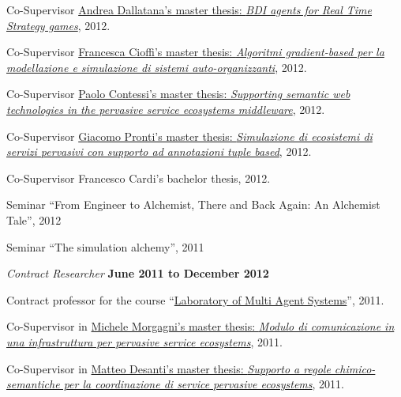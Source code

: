\documentclass[10pt]{article}
\newenvironment{outerlist}[1][\enskip\textbullet]%
        {\begin{itemize}[#1]}{\end{itemize}%
         \vspace{-.6\baselineskip}}
\newenvironment{innerlist}[1][\enskip\textbullet]%
        {\begin{compactitem}[#1]}{\end{compactitem}}
\newcommand{\halfblankline}{\quad\vspace{-0.5\baselineskip}\pagebreak[3]}
\begin{document}
\begin{outerlist}
\begin{innerlist}
      \item Co-Supervisor \href{http://amslaurea.unibo.it/4217/}{Andrea Dallatana's master thesis: \textit{BDI agents for Real Time Strategy games}}, 2012.
      \item Co-Supervisor \href{http://amslaurea.unibo.it/4088/}{Francesca Cioffi's master thesis: \textit{Algoritmi gradient-based per la modellazione e simulazione di sistemi auto-organizzanti}}, 2012.
      \item Co-Supervisor \href{http://amslaurea.unibo.it/4074/}{Paolo Contessi's master thesis: \textit{Supporting semantic web technologies in the pervasive service ecosystems middleware}}, 2012.
      \item Co-Supervisor \href{http://www.alice.unibo.it/xwiki/bin/view/Theses/ProntiAlchemistSapere/}{Giacomo Pronti's master thesis: \textit{Simulazione di ecosistemi di servizi pervasivi con supporto ad annotazioni tuple based}}, 2012.
      \item Co-Supervisor Francesco Cardi's bachelor thesis, 2012.
      \item Seminar ``From Engineer to Alchemist, There and Back Again: An Alchemist Tale'', 2012
      \item Seminar ``The simulation alchemy'', 2011
    \end{innerlist}
\item[] \textit{Contract Researcher} \hfill \textbf{June 2011 to December 2012}
    \begin{innerlist}
      \item Contract professor for the course ``\href{http://apice.unibo.it/xwiki/bin/view/Courses/SmaLm1112Lab}{Laboratory of Multi Agent Systems}'', 2011.
      \item Co-Supervisor in \href{http://apice.unibo.it/xwiki/bin/view/Theses/SapereComm}{Michele Morgagni's master thesis: \textit{Modulo di comunicazione in una infrastruttura per pervasive service ecosystems}}, 2011.
      \item Co-Supervisor in \href{http://www.alice.unibo.it/xwiki/bin/view/Theses/LSAspace}{Matteo Desanti's master thesis: \textit{Supporto a regole chimico-semantiche per la coordinazione di service pervasive ecosystems}}, 2011.
    \end{innerlist}
\halfblankline
\end{outerlist}
\end{document}
